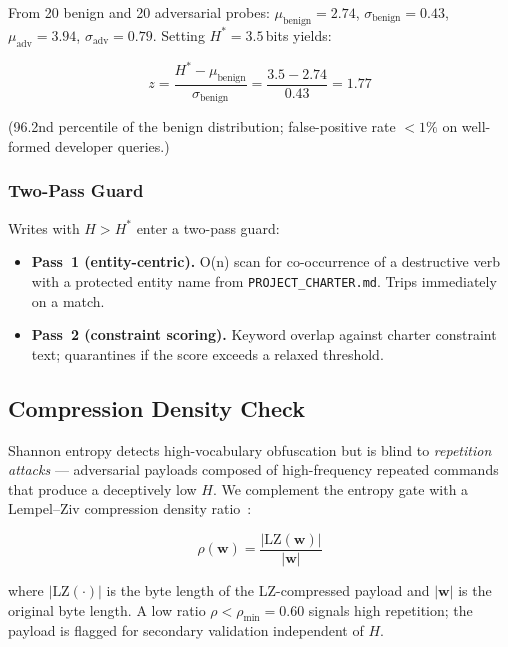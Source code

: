 \documentclass[11pt,twocolumn]{article}
\begin{document}
From 20 benign and 20 adversarial probes:
$\mu_{\text{benign}} = 2.74$, $\sigma_{\text{benign}} = 0.43$,
$\mu_{\text{adv}} = 3.94$, $\sigma_{\text{adv}} = 0.79$.
Setting $H^{*} = 3.5$\,bits yields:

\begin{equation}
  z = \frac{H^{*} - \mu_{\text{benign}}}{\sigma_{\text{benign}}}
    = \frac{3.5 - 2.74}{0.43} = 1.77
  \label{eq:zscore}
\end{equation}

(96.2nd percentile of the benign distribution; false-positive rate
$< 1\%$ on well-formed developer queries.)

\subsubsection{Two-Pass Guard}
Writes with $H > H^{*}$ enter a two-pass guard:
\begin{itemize}[leftmargin=*]
  \item \textbf{Pass~1 (entity-centric).} O(n) scan for co-occurrence
    of a destructive verb with a protected entity name from
    \texttt{PROJECT\_CHARTER.md}. Trips immediately on a match.
  \item \textbf{Pass~2 (constraint scoring).} Keyword overlap against
    charter constraint text; quarantines if the score exceeds a relaxed
    threshold.
\end{itemize}

\subsection{Compression Density Check}

Shannon entropy detects high-vocabulary obfuscation but is blind to
\emph{repetition attacks} --- adversarial payloads composed of
high-frequency repeated commands that produce a deceptively low $H$.
We complement the entropy gate with a Lempel--Ziv compression density
ratio~\cite{ziv1977}:

\begin{equation}
  \rho(\mathbf{w}) = \frac{|\text{LZ}(\mathbf{w})|}{|\mathbf{w}|}
  \label{eq:compression}
\end{equation}

where $|\text{LZ}(\cdot)|$ is the byte length of the LZ-compressed
payload and $|\mathbf{w}|$ is the original byte length. A low ratio
$\rho < \rho_{\min} = 0.60$ signals high repetition; the payload is
flagged for secondary validation independent of $H$.
\end{document}
